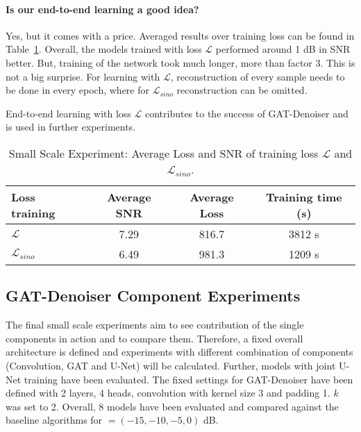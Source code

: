 \paragraph{Is our end-to-end learning a good idea?}
Yes, but it comes with a price. 
Averaged results over training loss can be found in Table~\ref{tab:loss_sino_reco}. 
Overall, the models trained with loss $\mathcal{L} $ performed around 1 dB in SNR better.
But, training of the network took much longer, more than factor 3. 
This is not a big surprise. For learning with $\mathcal{L} $, reconstruction of every sample
needs to be done in every epoch, where for $\mathcal{L}_{sino}$ reconstruction can be omitted.

\begin{tcolorbox}[colback=red!5!white,colframe=red!75!black]
  End-to-end learning with loss $\mathcal{L} $ contributes to the success of GAT-Denoiser and 
   is used in further experiments.
\end{tcolorbox}


\begin{table}[H]
  \centering
    \begin{tabular}{l|ccc}
    \toprule
    \textbf{Loss training} & \textbf{Average SNR} & \textbf{Average Loss} & \textbf{Training time (s)}  \\ 
    \midrule
    $\mathcal{L} $         &  7.29    &  816.7  & 3812 s \\ \hline
    $\mathcal{L}_{sino}$   &  6.49    &  981.3  & 1209 s \\ \hline
    \midrule
    \end{tabular}
  \caption{Small Scale Experiment: Average Loss and SNR of training loss $\mathcal{L}$ and $\mathcal{L}_{sino}$.}
  \label{tab:loss_sino_reco}
\end{table}


\subsection{GAT-Denoiser Component Experiments}

The final small scale experiments aim to see contribution of the single components in action and 
to compare them.
Therefore, a fixed overall architecture is defined and experiments
with different combination of components (Convolution, GAT and U-Net) will be calculated.
Further, models with joint U-Net training have been evaluated.
The fixed settings for GAT-Denoiser have been defined with 2 layers, 4 heads, convolution with 
kernel size 3 and padding 1. $k$ was set to 2.
Overall, 8 models have been evaluated and compared against the baseline algorithms for  \snry $ = (-15,-10,-5,0) $ dB.

